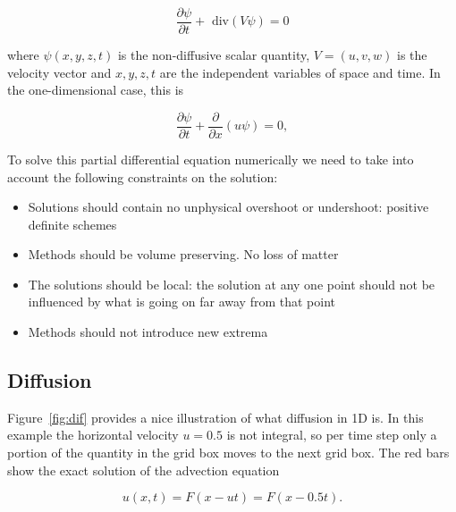 \documentclass[10pt, a4paper]{article}
\begin{document}
\begin{equation}
\frac{\partial \psi}{\partial t} + \text{ div}(V\psi) = 0
\end{equation}

where $\psi(x,y,z,t)$ is the non-diffusive scalar quantity, $V=(u,v,w)$ is the velocity vector and $x,y,z,t$ are the independent variables of space and time. In the one-dimensional case, this is

\begin{equation}
\frac{\partial \psi}{\partial t} + \frac{\partial}{\partial x}(u\psi) = 0,
\end{equation}

To solve this partial differential equation numerically we need to take into account the following constraints on the solution:

\begin{itemize}
\item Solutions should contain no unphysical overshoot or undershoot: positive definite schemes
\item Methods should be volume preserving. No loss of matter
\item The solutions should be local: the solution at any one point should not be influenced by what is going on far away from that point
\item Methods should not introduce new extrema
\end{itemize}

\subsection{Diffusion}
Figure~\ref{fig:dif} provides a nice illustration of what diffusion in 1D is. In this example the horizontal velocity $u=0.5$ is not integral, so per time step only a portion of the quantity in the grid box moves to the next grid box. The red bars show the exact solution of the advection equation

\begin{equation}
 u(x,t)=F(x-ut)=F(x-0.5t).
\end{equation}
\end{document}
